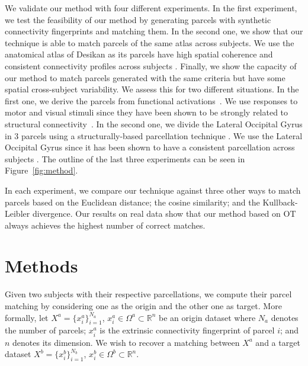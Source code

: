 We validate our method with four different experiments. In the first experiment,
we test the feasibility of our method by generating parcels with synthetic
connectivity fingerprints and matching them. In the second one, we show that
our technique is able to match parcels of the same atlas across subjects. We
use the anatomical atlas of Desikan \cite{Desikan2006} as its parcels have
high spatial coherence and consistent connectivity profiles across
subjects \cite{DeReus2013}. Finally, we show the capacity of our method to
match parcels generated with the same criteria but have some spatial
cross-subject variability. We assess this for two different situations. In the
first one, we derive the parcels from functional activations~\cite{Barch2013}.
We use responses to motor and visual stimuli since they have been shown to be
strongly related to structural connectivity~\cite{Osher2016, Penfield1954}. 
In the second one, we divide the Lateral Occipital Gyrus in 3 parcels using
a structurally-based parcellation technique  \cite{Gallardo2017a}. We use
the Lateral Occipital Gyrus since it has been shown to have a consistent
parcellation across subjects \cite{ThiebautdeSchotten2016, Gallardo2017a}.
The outline of the last three experiments can be seen in Figure~\ref{fig:method}.

In each experiment, we compare our technique against three other ways to match
parcels based on the Euclidean distance; the cosine similarity; and the
Kullback-Leibler divergence. Our results on real data show that our method
based on OT always achieves the highest number of correct matches.


\section{Methods}

Given two subjects with their respective parcellations, we compute their parcel matching by considering one as the origin and the other one as target. 
More formally, let $X^a = \{x^a_i\}_{i=1}^{N_a}$, $x^a_i \in \Omega^a \subset \mathbb{R}^n$ be an origin dataset where $N_a$ denotes the number of parcels; $x^a_i$ is the extrinsic connectivity fingerprint of parcel $i$; and $n$ denotes its dimension. We wish to recover a matching between $X^a$ and a target dataset ${X^b = \{x^b_i\}_{i=1}^{N_b}}$, $x^b_i \in \Omega^b \subset \mathbb{R}^n$.

